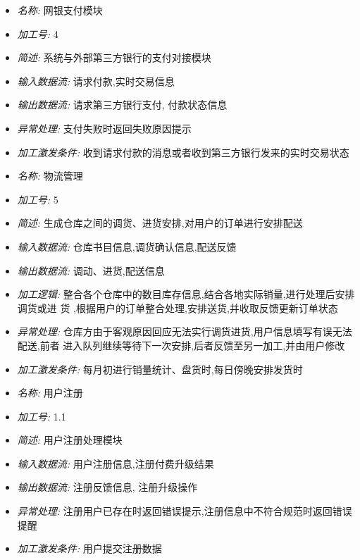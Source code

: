 \documentclass{article}
\begin{document}
\begin{CJK*}{UTF8}{gbsn}
\begin{itemize}
\end{itemize}


\vspace{-1mm}


\begin{itemize}
\item \textit{名称: } 网银支付模块
\item \textit{加工号: }4
\item \textit{简述: } 系统与外部第三方银行的支付对接模块
\item \textit{输入数据流: } 请求付款,实时交易信息
\item \textit{输出数据流: } 请求第三方银行支付, 付款状态信息
\item \textit{异常处理: } 支付失败时返回失败原因提示
\item \textit{加工激发条件: } 收到请求付款的消息或者收到第三方银行发来的实时交易状态

\end{itemize}


\vspace{-1mm}


\begin{itemize}
\item \textit{名称: }物流管理
\item \textit{加工号: }5
\item \textit{简述: }生成仓库之间的调货、进货安排,对用户的订单进行安排配送
\item \textit{输入数据流: } 仓库书目信息,调货确认信息,配送反馈 
\item \textit{输出数据流: }调动、进货,配送信息 
\item \textit{加工逻辑: }整合各个仓库中的数目库存信息,结合各地实际销量,进行处理后安排调货或进 货 ,根据用户的订单整合处理,安排送货,并收取反馈更新订单状态 
\item \textit{异常处理: }仓库方由于客观原因回应无法实行调货进货,用户信息填写有误无法配送,前者 进入队列继续等待下一次安排,后者反馈至另一加工,并由用户修改 
\item \textit{加工激发条件: }每月初进行销量统计、盘货时,每日傍晚安排发货时

\end{itemize}


\vspace{-1mm}


\begin{itemize}
\item \textit{名称: } 用户注册
\item \textit{加工号: } 1.1
\item \textit{简述: } 用户注册处理模块
\item \textit{输入数据流: } 用户注册信息,注册付费升级结果
\item \textit{输出数据流: } 注册反馈信息, 注册升级操作
\item \textit{异常处理: } 注册用户已存在时返回错误提示,注册信息中不符合规范时返回错误提醒 
\item \textit{加工激发条件: } 用户提交注册数据


\end{itemize}
\end{CJK*}
\end{document}
